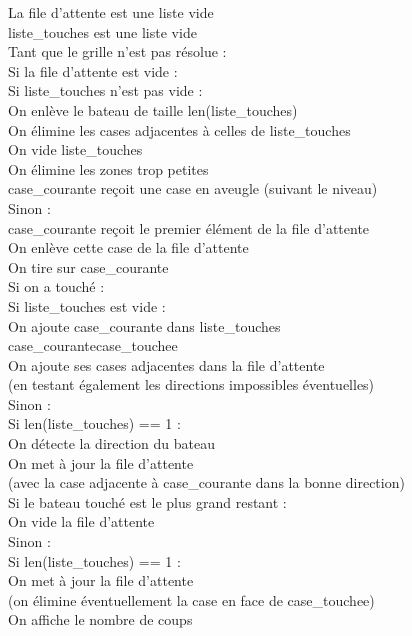 \begin{algo1}
La file d'attente est une liste vide\\
liste\_touches est une liste vide\\
Tant que le grille n'est pas résolue :\\
Si la file d'attente est vide :\\
Si liste\_touches n'est pas vide :\\
On enlève le bateau de taille len(liste\_touches)\\
On élimine les cases adjacentes à celles de liste\_touches\\
On vide liste\_touches\\
On élimine les zones trop petites\\
case\_courante reçoit une case en aveugle (suivant le niveau)\\
Sinon :\\
case\_courante reçoit le premier élément de la file d'attente\\
On enlève cette case de la file d'attente\\
On tire sur case\_courante\\
Si on a touché :\\
Si liste\_touches est vide :\\
On ajoute case\_courante dans liste\_touches\\
case\_courante\sto case\_touchee\\
On ajoute ses cases adjacentes dans la file d'attente\\
(en testant également les directions impossibles éventuelles)\\
Sinon :\\
Si len(liste\_touches) == 1 :\\
On détecte la direction du bateau\\
On met à jour la file d'attente\\
(avec la case adjacente à case\_courante dans la bonne direction)\\
Si le bateau touché est le plus grand restant :\\
On vide la file d'attente\\
Sinon :\\
Si len(liste\_touches) == 1 :\\
On met à jour la file d'attente\\
(on élimine éventuellement la case en face de case\_touchee)\\
On affiche le nombre de coups\\
\end{algo1}

